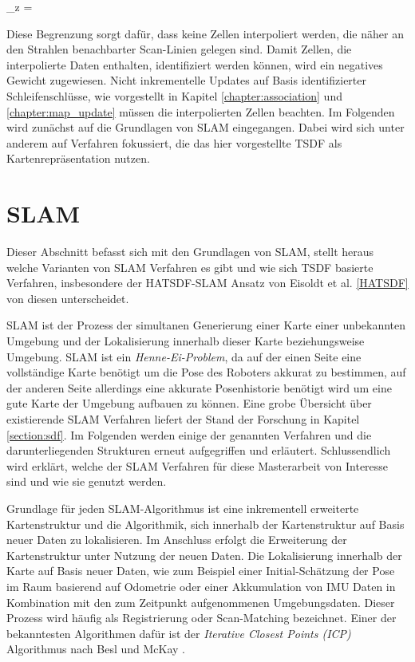 \begin{myequation}
\Delta_z = 
\end{myequation}

Diese Begrenzung sorgt dafür, dass keine Zellen interpoliert werden, die näher an den Strahlen benachbarter Scan-Linien gelegen sind. Damit Zellen, die interpolierte Daten enthalten, identifiziert werden können, wird ein negatives Gewicht zugewiesen. Nicht inkrementelle Updates auf Basis identifizierter Schleifenschlüsse, wie vorgestellt in Kapitel \ref{chapter:association} und \ref{chapter:map_update} müssen die interpolierten Zellen beachten. Im Folgenden wird zunächst auf die Grundlagen von SLAM eingegangen. Dabei wird sich unter anderem auf Verfahren fokussiert, die das hier vorgestellte TSDF als Kartenrepräsentation nutzen.

\section{SLAM}
\label{section:slam}

Dieser Abschnitt befasst sich mit den Grundlagen von SLAM, stellt heraus welche Varianten von SLAM Verfahren es gibt und wie sich TSDF basierte Verfahren, insbesondere der HATSDF-SLAM Ansatz von Eisoldt et al. \ref{HATSDF} von diesen unterscheidet.

SLAM ist der Prozess der simultanen Generierung einer Karte einer unbekannten Umgebung und der Lokalisierung innerhalb dieser Karte beziehungsweise Umgebung. SLAM ist ein \emph{Henne-Ei-Problem}, da auf der einen Seite eine vollständige Karte benötigt um die Pose des Roboters akkurat zu bestimmen, auf der anderen Seite allerdings eine akkurate Posenhistorie benötigt wird um eine gute Karte der Umgebung aufbauen zu können. Eine grobe Übersicht über existierende SLAM Verfahren liefert der Stand der Forschung in Kapitel \ref{section:sdf}. Im Folgenden werden einige der genannten Verfahren und die darunterliegenden Strukturen erneut aufgegriffen und erläutert.
Schlussendlich wird erklärt, welche der SLAM Verfahren für diese Masterarbeit von Interesse sind und wie sie genutzt werden.

Grundlage für jeden SLAM-Algorithmus ist eine inkrementell erweiterte Kartenstruktur und die Algorithmik, sich innerhalb der Kartenstruktur auf Basis neuer Daten zu lokalisieren. Im Anschluss erfolgt die Erweiterung der Kartenstruktur unter Nutzung der neuen Daten. Die Lokalisierung innerhalb der Karte auf Basis neuer Daten, wie zum Beispiel einer Initial-Schätzung der Pose im Raum basierend auf Odometrie oder einer Akkumulation von IMU Daten in Kombination mit den zum Zeitpunkt aufgenommenen Umgebungsdaten. Dieser Prozess wird häufig als Registrierung oder Scan-Matching bezeichnet. Einer der bekanntesten Algorithmen dafür ist der \emph{Iterative Closest Points (ICP)} Algorithmus nach Besl und McKay \cite{Besl:1992}.

